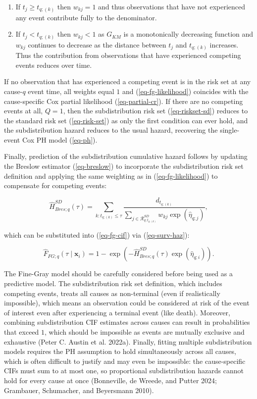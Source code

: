 \documentclass[
  letterpaper,
  krantz2]{style/krantz}
\providecommand{\tightlist}{%
  \setlength{\itemsep}{0pt}\setlength{\parskip}{0pt}}
\begin{document}
\begin{enumerate}
\def\labelenumi{\arabic{enumi}.}
\tightlist
\item
  If \(t_j \geq t_{q;(k)}\) then \(w_{kj} = 1\) and thus observations
  that have not experienced any event contribute fully to the
  denominator.
\item
  If \(t_j < t_{q;(k)}\) then \(w_{kj} < 1\) as \(G_{KM}\) is a
  monotonically decreasing function and \(w_{kj}\) continues to decrease
  as the distance between \(t_j\) and \(t_{q;(k)}\) increases. Thus the
  contribution from observations that have experienced competing events
  reduces over time.
\end{enumerate}

If no observation that has experienced a competing event is in the risk
set at any cause-\(q\) event time, all weights equal \(1\) and
(\ref{eq-fg-likelihood}) coincides with the cause-specific Cox partial
likelihood (\ref{eq-partial-cr}). If there are no competing events at
all, \(Q=1\), then the subdistribution risk set (\ref{eq-riskset-sd})
reduces to the standard risk set (\ref{eq-risk-set}) as only the first
condition can ever hold, and the subdistribution hazard reduces to the
usual hazard, recovering the single-event Cox PH model (\ref{eq-ph}).

Finally, prediction of the subdistribution cumulative hazard follows by
updating the Breslow estimator (\ref{eq-breslow}) to incorporate the
subdistribution risk set definition and applying the same weighting as
in (\ref{eq-fg-likelihood}) to compensate for competing
events:

\[
\hat{H}^{SD}_{Bres;q}(\tau) = \sum_{k:t_{q;(k)}\leq \tau} \frac{d_{t_{q;(k)}}}{\sum_{j \in \mathcal{R}^{SD}_{q;t_{q;(k)}}} w_{kj}\exp(\hat{\eta}_{q;j})},
\]

which can be substituted into (\ref{eq-fg-cif}) via (\ref{eq-surv-haz}):

\[
\hat{F}_{FG;q}(\tau \mid \mathbf{x}_i) = 1 - \exp\left(-\hat{H}^{SD}_{Bres;q}(\tau)\exp(\hat{\eta}_{q;i})\right).
\]

The Fine-Gray model should be carefully considered before being used as
a predictive model. The subdistribution risk set definition, which
includes competing events, treats all causes as non-terminal (even if
realistically impossible), which means an observation could be
considered at risk of the event of interest even after experiencing a
terminal event (like death). Moreover, combining subdistribution CIF
estimates across causes can result in probabilities that exceed \(1\),
which should be impossible as events are mutually exclusive and
exhaustive (Peter C. Austin et al. 2022a). Finally, fitting multiple
subdistribution models requires the PH assumption to hold simultaneously
across all causes, which is often difficult to justify and may even be
impossible: the cause-specific CIFs must sum to at most one, so
proportional subdistribution hazards cannot hold for every cause at once
(Bonneville, de Wreede, and Putter 2024; Grambauer, Schumacher, and
Beyersmann 2010).
\end{document}
